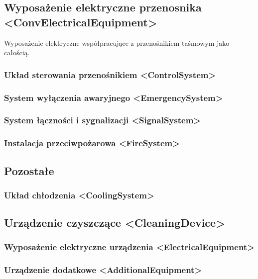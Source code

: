 \documentclass[12pt,a4paper]{article}
\begin{document}
\subsection{Wyposażenie elektryczne przenosnika <ConvElectricalEquipment>}
Wyposażenie elektryczne współpracujące z przenośnikiem taśmowym jako całością.


\subsubsection{Układ sterowania przenośnikiem <ControlSystem>}


\subsubsection{System wyłączenia awaryjnego <EmergencySystem>}


\subsubsection{System łączności i sygnalizacji <SignalSystem>}


\subsubsection{Instalacja przeciwpożarowa <FireSystem>}


\subsection{Pozostałe}

\subsubsection{Układ chłodzenia <CoolingSystem>}

\subsection{Urządzenie czyszczące <CleaningDevice>}

\subsubsection{Wyposażenie elektryczne urządzenia <ElectricalEquipment>}

\subsubsection{Urządzenie dodatkowe <AdditionalEquipment>}
\end{document}
